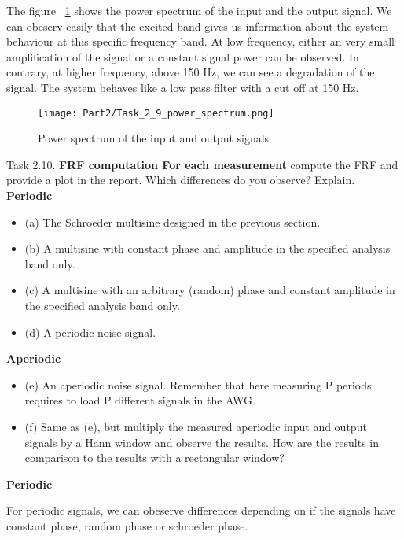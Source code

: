 The figure ~\ref{Power spectrum} shows the power spectrum of the input and the output signal.
We can obeserv easily that the excited band gives us information about the system behaviour at this specific frequency band.
At low frequency, either an very small amplification of the signal or a constant signal power can be observed.  In contrary, at higher frequency, above 150 Hz, we can see a degradation of the signal.
The system behaves like a low pass filter with a cut off at 150 Hz.

\begin{figure}[H]
    \centering
    \texttt{[image: Part2/Task\_2\_9\_power\_spectrum.png]}
    \caption{Power spectrum of the input and output signals}
    \label{Power spectrum}
\end{figure}

\begin{Task}{Task 2.10.}
    \textbf{FRF computation For each measurement} compute the FRF and
    provide a plot in the report. Which differences do you observe? Explain.
    \textbf{Periodic}
    \begin{itemize}
        \item(a) The Schroeder multisine designed in the previous section.
        \item(b) A multisine with constant phase and amplitude in the specified analysis band
        only.
        \item(c) A multisine with an arbitrary (random) phase and constant amplitude in the
        specified analysis band only.
        \item(d) A periodic noise signal.
    \end{itemize}
    \textbf{Aperiodic}
    \begin{itemize}
        \item(e) An aperiodic noise signal. Remember that here measuring P periods requires
        to load P different signals in the AWG.
        \item(f) Same as (e), but multiply the measured aperiodic input and output signals by
        a Hann window and observe the results. How are the results in comparison to
        the results with a rectangular window?
    \end{itemize}
\end{Task}


\textbf{Periodic}

For periodic signals, we can obeserve differences depending on if the signals have constant phase, random phase or schroeder phase.

